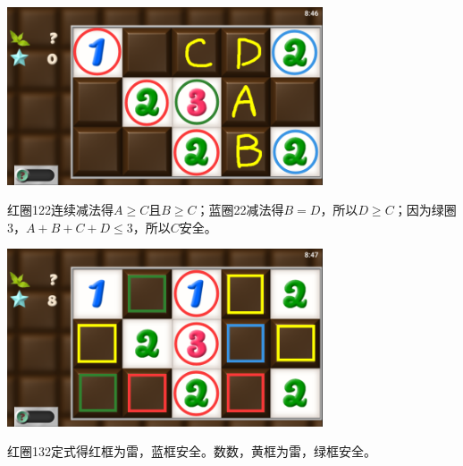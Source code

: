 \subsection{} %
\begin{center}
    \includegraphics[width=0.7\textwidth]{puzzle/111-1.png}
\end{center}
红圈122连续减法得$A\ge C$且$B\ge C$；蓝圈22减法得$B=D$，所以$D\ge C$；因为绿圈3，$A+B+C+D\le 3$，所以$C$安全。
\begin{center}
    \includegraphics[width=0.7\textwidth]{puzzle/111-2.png}
\end{center}
红圈132定式得红框为雷，蓝框安全。数数，黄框为雷，绿框安全。

